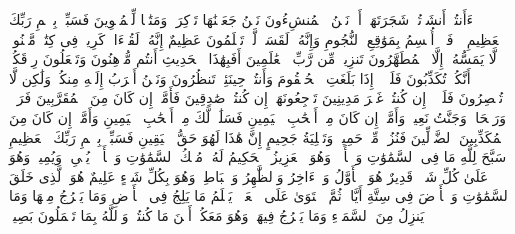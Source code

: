 \startbuffer[\q:56:72]
ءَأَنتُمۡ أَنشَأۡتُمۡ شَجَرَتَهَاۤ أَمۡ نَحۡنُ ٱلۡمُنشِءُونَ%
\stopbuffer%
\startbuffer[\q:56:73]
نَحۡنُ جَعَلۡنَٰهَا تَذۡكِرَةࣰ وَمَتَٰعࣰا لِّلۡمُقۡوِینَ%
\stopbuffer%
\startbuffer[\q:56:74]
فَسَبِّحۡ بِٱسۡمِ رَبِّكَ ٱلۡعَظِیمِ%
\stopbuffer%
\startbuffer[\q:56:75]
۞ فَلَاۤ أُقۡسِمُ بِمَوَٰقِعِ ٱلنُّجُومِ%
\stopbuffer%
\startbuffer[\q:56:76]
وَإِنَّهُۥ لَقَسَمࣱ لَّوۡ تَعۡلَمُونَ عَظِیمٌ%
\stopbuffer%
\startbuffer[\q:56:77]
إِنَّهُۥ لَقُرۡءَانࣱ كَرِیمࣱ%
\stopbuffer%
\startbuffer[\q:56:78]
فِی كِتَٰبࣲ مَّكۡنُونࣲ%
\stopbuffer%
\startbuffer[\q:56:79]
لَّا یَمَسُّهُۥۤ إِلَّا ٱلۡمُطَهَّرُونَ%
\stopbuffer%
\startbuffer[\q:56:80]
تَنزِیلࣱ مِّن رَّبِّ ٱلۡعَٰلَمِینَ%
\stopbuffer%
\startbuffer[\q:56:81]
أَفَبِهَٰذَا ٱلۡحَدِیثِ أَنتُم مُّدۡهِنُونَ%
\stopbuffer%
\startbuffer[\q:56:82]
وَتَجۡعَلُونَ رِزۡقَكُمۡ أَنَّكُمۡ تُكَذِّبُونَ%
\stopbuffer%
\startbuffer[\q:56:83]
فَلَوۡلَاۤ إِذَا بَلَغَتِ ٱلۡحُلۡقُومَ%
\stopbuffer%
\startbuffer[\q:56:84]
وَأَنتُمۡ حِینَئِذࣲ تَنظُرُونَ%
\stopbuffer%
\startbuffer[\q:56:85]
وَنَحۡنُ أَقۡرَبُ إِلَیۡهِ مِنكُمۡ وَلَٰكِن لَّا تُبۡصِرُونَ%
\stopbuffer%
\startbuffer[\q:56:86]
فَلَوۡلَاۤ إِن كُنتُمۡ غَیۡرَ مَدِینِینَ%
\stopbuffer%
\startbuffer[\q:56:87]
تَرۡجِعُونَهَاۤ إِن كُنتُمۡ صَٰدِقِینَ%
\stopbuffer%
\startbuffer[\q:56:88]
فَأَمَّاۤ إِن كَانَ مِنَ ٱلۡمُقَرَّبِینَ%
\stopbuffer%
\startbuffer[\q:56:89]
فَرَوۡحࣱ وَرَیۡحَانࣱ وَجَنَّتُ نَعِیمࣲ%
\stopbuffer%
\startbuffer[\q:56:90]
وَأَمَّاۤ إِن كَانَ مِنۡ أَصۡحَٰبِ ٱلۡیَمِینِ%
\stopbuffer%
\startbuffer[\q:56:91]
فَسَلَٰمࣱ لَّكَ مِنۡ أَصۡحَٰبِ ٱلۡیَمِینِ%
\stopbuffer%
\startbuffer[\q:56:92]
وَأَمَّاۤ إِن كَانَ مِنَ ٱلۡمُكَذِّبِینَ ٱلضَّاۤلِّینَ%
\stopbuffer%
\startbuffer[\q:56:93]
فَنُزُلࣱ مِّنۡ حَمِیمࣲ%
\stopbuffer%
\startbuffer[\q:56:94]
وَتَصۡلِیَةُ جَحِیمٍ%
\stopbuffer%
\startbuffer[\q:56:95]
إِنَّ هَٰذَا لَهُوَ حَقُّ ٱلۡیَقِینِ%
\stopbuffer%
\startbuffer[\q:56:96]
فَسَبِّحۡ بِٱسۡمِ رَبِّكَ ٱلۡعَظِیمِ%
\stopbuffer%
\startbuffer[\q:57:1]
سَبَّحَ لِلَّهِ مَا فِی ٱلسَّمَٰوَٰتِ وَٱلۡأَرۡضِۖ وَهُوَ ٱلۡعَزِیزُ ٱلۡحَكِیمُ%
\stopbuffer%
\startbuffer[\q:57:2]
لَهُۥ مُلۡكُ ٱلسَّمَٰوَٰتِ وَٱلۡأَرۡضِۖ یُحۡیِۦ وَیُمِیتُۖ وَهُوَ عَلَىٰ كُلِّ شَیۡءࣲ قَدِیرٌ%
\stopbuffer%
\startbuffer[\q:57:3]
هُوَ ٱلۡأَوَّلُ وَٱلۡءَاخِرُ وَٱلظَّٰهِرُ وَٱلۡبَاطِنُۖ وَهُوَ بِكُلِّ شَیۡءٍ عَلِیمٌ%
\stopbuffer%
\startbuffer[\q:57:4]
هُوَ ٱلَّذِی خَلَقَ ٱلسَّمَٰوَٰتِ وَٱلۡأَرۡضَ فِی سِتَّةِ أَیَّامࣲ ثُمَّ ٱسۡتَوَىٰ عَلَى ٱلۡعَرۡشِۖ یَعۡلَمُ مَا یَلِجُ فِی ٱلۡأَرۡضِ وَمَا یَخۡرُجُ مِنۡهَا وَمَا یَنزِلُ مِنَ ٱلسَّمَاۤءِ وَمَا یَعۡرُجُ فِیهَاۖ وَهُوَ مَعَكُمۡ أَیۡنَ مَا كُنتُمۡۚ وَٱللَّهُ بِمَا تَعۡمَلُونَ بَصِیرࣱ%
